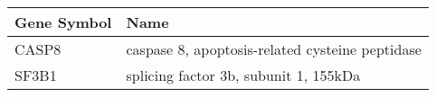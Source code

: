\begin{tabular}{ll}
\toprule
Gene Symbol &                                            Name \\
\midrule
      CASP8 & caspase 8, apoptosis-related cysteine peptidase \\
      SF3B1 &           splicing factor 3b, subunit 1, 155kDa \\
\bottomrule
\end{tabular}
